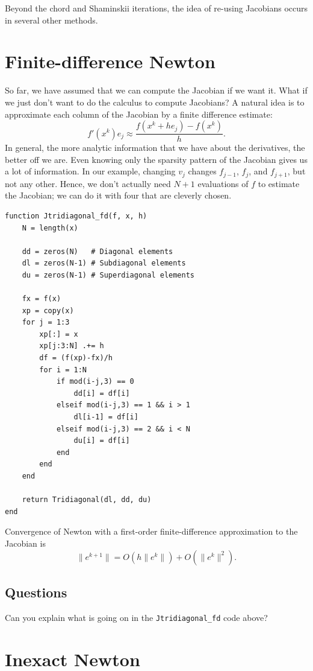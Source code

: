 \documentclass[12pt, leqno]{article} %
\begin{document}
Beyond the chord and Shaminskii iterations, the idea of re-using
Jacobians occurs in several other methods.

\section{Finite-difference Newton}

So far, we have assumed that we can compute the Jacobian if we want it.
What if we just don't want to do the calculus to compute Jacobians? A
natural idea is to approximate each column of the Jacobian by a finite
difference estimate:
\[f'(x^k) e_j \approx \frac{f(x^k+he_j)-f(x^k)}{h}.\] In general, the
more analytic information that we have about the derivatives, the better
off we are. Even knowing only the sparsity pattern of the Jacobian gives
us a lot of information. In our example, changing \(v_j\) changes
\(f_{j-1}\), \(f_j\), and \(f_{j+1}\), but not any other. Hence, we
don't actually need \(N+1\) evaluations of \(f\) to estimate the
Jacobian; we can do it with four that are cleverly chosen.

\begin{verbatim}
function Jtridiagonal_fd(f, x, h)
    N = length(x)

    dd = zeros(N)   # Diagonal elements
    dl = zeros(N-1) # Subdiagonal elements
    du = zeros(N-1) # Superdiagonal elements
    
    fx = f(x)
    xp = copy(x)
    for j = 1:3
        xp[:] = x
        xp[j:3:N] .+= h
        df = (f(xp)-fx)/h
        for i = 1:N
            if mod(i-j,3) == 0
                dd[i] = df[i]
            elseif mod(i-j,3) == 1 && i > 1
                dl[i-1] = df[i]
            elseif mod(i-j,3) == 2 && i < N
                du[i] = df[i]
            end
        end
    end

    return Tridiagonal(dl, dd, du)
end
\end{verbatim}

Convergence of Newton with a first-order finite-difference approximation
to the Jacobian is \[\|e^{k+1}\| = O(h\|e^k\|) + O(\|e^k\|^2).\]

\subsection{Questions}

Can you explain what is going on in the \texttt{Jtridiagonal\_fd} code
above?

\section{Inexact Newton}
\end{document}
